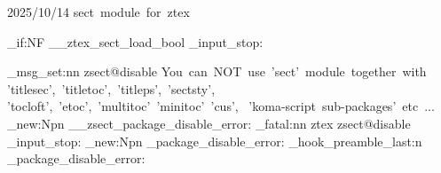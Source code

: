   {2025/10/14}{\ztex@versi@n}
  {sect~module~for~ztex}




\bool_if:NF \g__ztex_sect_load_bool 
  { \file_input_stop: }


\ztex_msg_set:nn { zsect@disable }
  {
    You~can~NOT~use~'sect'~module~together~with~
    'titlesec',~'titletoc',~'titleps',~'sectsty',~
    'tocloft',~'etoc',~'multitoc'~'minitoc'~'cus',~
    'koma-script~sub-packages'~etc~...
  }
\cs_new:Npn \__zsect_package_disable_error:
  {
    \msg_fatal:nn { ztex } { zsect@disable }
    \file_input_stop:
  }
\cs_new:Npn \zsect_package_disable_error:
  {
  }
\ztex_hook_preamble_last:n 
  {
    \zsect_package_disable_error:
  }



